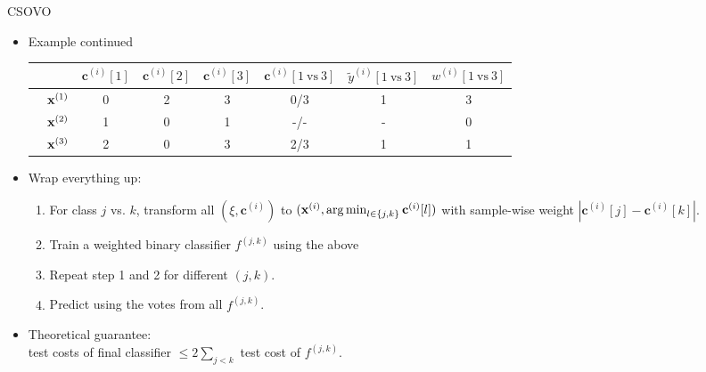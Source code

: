 \documentclass[11pt,compress,t,notes=noshow, xcolor=table]{beamer}
\newcommand{\cv}{\mathbf{c}}
\begin{document}
\begin{frame}{CSOVO}
    \begin{itemize}
    \item Example continued
    \begin{center}  
        \footnotesize{
            \begin{tabular}{cc|ccc|ccc}
                & & $\cv^{(i)}[1]$ & $\cv^{(i)}[2]$ & $\cv^{(i)}[3]$ & $\cv^{(i)}[1 \ \text{vs} \ 3]$ & $\tilde{y}^{( i)}[1 \ \text{vs} \ 3]$ & $w^{(i)}[1 \ \text{vs} \ 3]$\\
                \hline & $\mathbf{x}^{(1)}$ & 0 & 2 & 3 & 0/3 & 1 & 3\\
                & $\mathbf{x}^{(2)}$ & 1 & 0 & 1 & -/- & - & 0 \\
                & $\mathbf{x}^{(3)}$ & 2 & 0 & 3 & 2/3 & 1 & 1\\
            \end{tabular}
        }
    \end{center}

    \item Wrap everything up:
    \begin{enumerate}
        \item For class $j$ vs. $k$, transform all $(\xi, \cv^{(i)})$ to $(\xi, \argmin_{l \in \{j, k\}} \cv^{(i)}[l])$ with sample-wise weight $|\cv^{(i)}[j] - \cv^{(i)}[k]|$.
        
        \item Train a weighted binary classifier $f^{(j, k)}$ using the above
        
        \item Repeat step 1 and 2 for different $(j, k)$.
        
        \item Predict using the votes from all $f^{(j, k)}$.
    \end{enumerate}

    \item Theoretical guarantee:\\ 
    test costs of final classifier $\leq 2\sum_{j < k}$ test cost of $f^{(j, k)}$. 
    \end{itemize}
\end{frame}
\end{document}
